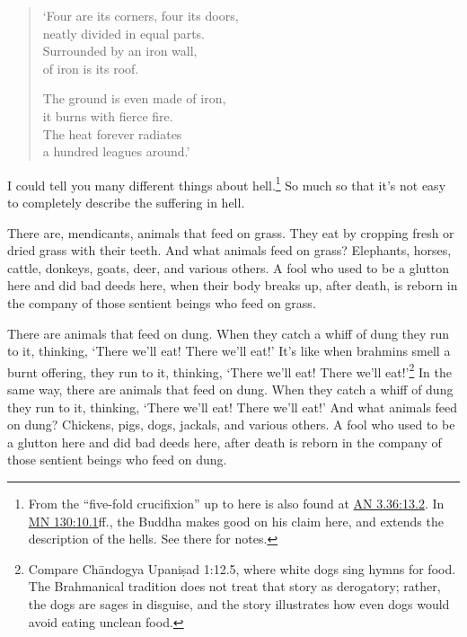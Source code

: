 \documentclass[12pt,openany]{book}%
\begin{document}
\begin{verse}%
‘Four are its corners, four its doors, \\
neatly divided in equal parts. \\
Surrounded by an iron wall, \\
of iron is its roof. 

The ground is even made of iron, \\
it burns with fierce fire. \\
The heat forever radiates \\
a hundred leagues around.’ 

%
\end{verse}

I could tell you many different things about hell.\footnote{From the “five-fold crucifixion” up to here is also found at \href{https://suttacentral.net/an3.36/en/sujato\#13.2}{AN 3.36:13.2}. In \href{https://suttacentral.net/mn130/en/sujato\#10.1}{MN 130:10.1}ff., the Buddha makes good on his claim here, and extends the description of the hells. See there for notes. } So much so that it’s not easy to completely describe the suffering in hell. 

There are, mendicants, animals that feed on grass. They eat by cropping fresh or dried grass with their teeth. And what animals feed on grass? Elephants, horses, cattle, donkeys, goats, deer, and various others. A fool who used to be a glutton here and did bad deeds here, when their body breaks up, after death, is reborn in the company of those sentient beings who feed on grass. 

There are animals that feed on dung. When they catch a whiff of dung they run to it, thinking, ‘There we’ll eat! There we’ll eat!’ It’s like when brahmins smell a burnt offering, they run to it, thinking, ‘There we’ll eat! There we’ll eat!’\footnote{Compare \textsanskrit{Chāndogya} \textsanskrit{Upaniṣad} 1:12.5, where white dogs sing hymns for food. The Brahmanical tradition does not treat that story as derogatory; rather, the dogs are sages in disguise, and the story illustrates how even dogs would avoid eating unclean food. } In the same way, there are animals that feed on dung. When they catch a whiff of dung they run to it, thinking, ‘There we’ll eat! There we’ll eat!’ And what animals feed on dung? Chickens, pigs, dogs, jackals, and various others. A fool who used to be a glutton here and did bad deeds here, after death is reborn in the company of those sentient beings who feed on dung. 
\end{document}
